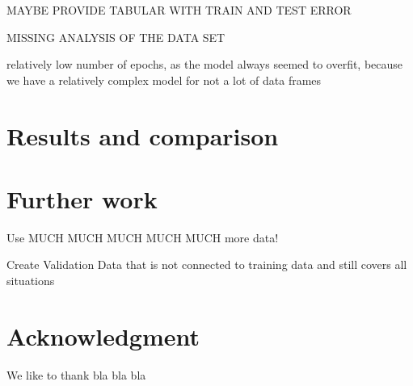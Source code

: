 \documentclass[conference]{IEEEtran}
\begin{document}
MAYBE PROVIDE TABULAR WITH TRAIN AND TEST ERROR

MISSING ANALYSIS OF THE DATA SET

relatively low number of epochs, as the model always seemed to overfit, because we have a relatively complex model for not a lot of
data frames



\section{Results and comparison}

\section{Further work}

Use MUCH MUCH MUCH MUCH MUCH more data!

Create Validation Data that is not connected to training data and still covers all situations


\section*{Acknowledgment}
We like to thank bla bla bla




\printbibliography
\end{document}
